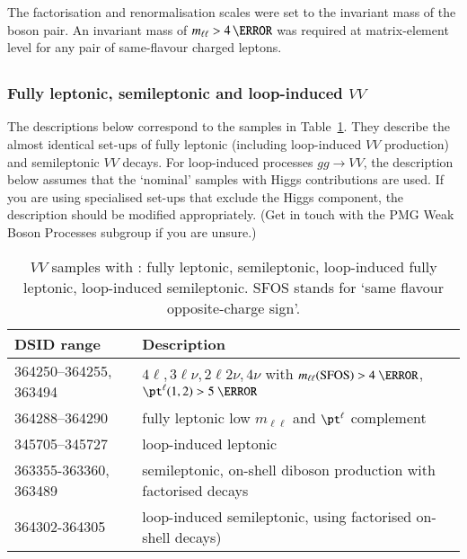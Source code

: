 The factorisation and renormalisation scales were set to the invariant mass of
the boson pair. An invariant mass of $m_{\ell\ell} > 4\,\GeV$ was required
at matrix-element level for any pair of same-flavour charged leptons.


\subsection[Sherpa]{\SHERPA}


\subsubsection{Fully leptonic, semileptonic and loop-induced \texorpdfstring{$VV$}{VV}}

The descriptions below correspond to the samples in
Table~\ref{tab:MB-sherpa}. They describe the almost
identical set-ups of fully leptonic (including loop-induced $VV$ production)
and semileptonic $VV$ decays. For loop-induced processes $gg\to VV$, 
the description below assumes that the `nominal' samples with 
Higgs contributions are used. If you are using specialised set-ups that
exclude the Higgs component, the description should be modified appropriately.
(Get in touch with the PMG Weak Boson Processes subgroup if you are unsure.)

\begin{table}[htbp]
  \begin{center}
    \caption{$VV$ samples with \SHERPA: fully leptonic, semileptonic,
      loop-induced fully leptonic, loop-induced semileptonic. SFOS stands for
      `same flavour opposite-charge sign'.}
      \label{tab:MB-sherpa}
    \begin{tabular}{ l | l }
      \hline
      DSID range & Description \\
      \hline
      364250--364255, 363494   & $4\ell, 3\ell\nu, 2\ell 2\nu, 4\nu$ with $m_{\ell\ell}\mathrm{(SFOS)} > 4~\GeV$, $\pt^\ell(1,2)>5~\GeV$\\
      364288--364290 & fully leptonic low $m_{\ell\ell}$ and $\pt^\ell$ complement\\
      \hline
      345705--345727   & loop-induced leptonic\\
      \hline
      363355-363360, 363489   & semileptonic, on-shell diboson production with factorised decays\\
      \hline
      364302-364305   & loop-induced semileptonic, using factorised on-shell decays)\\
      \hline
    \end{tabular}
  \end{center}
\end{table}

